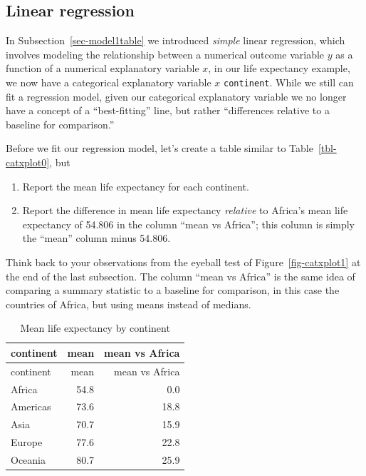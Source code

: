 \documentclass[
  letterpaper,
  DIV=11,
  numbers=noendperiod]{scrreprt}
\theoremstyle{definition}
\theoremstyle{remark}
\begin{document}
\hypertarget{sec-model2table}{%
\subsection{Linear regression}\label{sec-model2table}}

In Subsection~\ref{sec-model1table} we introduced \emph{simple} linear
regression, which involves modeling the relationship between a numerical
outcome variable \(y\) as a function of a numerical explanatory variable
\(x\), in our life expectancy example, we now have a categorical
explanatory variable \(x\) \texttt{continent}. While we still can fit a
regression model, given our categorical explanatory variable we no
longer have a concept of a ``best-fitting'' line, but rather
``differences relative to a baseline for comparison.''

Before we fit our regression model, let's create a table similar to
Table~\ref{tbl-catxplot0}, but

\begin{enumerate}
\def\labelenumi{\arabic{enumi}.}
\item
  Report the mean life expectancy for each continent.
\item
  Report the difference in mean life expectancy \emph{relative} to
  Africa's mean life expectancy of 54.806 in the column ``mean vs
  Africa''; this column is simply the ``mean'' column minus 54.806.
\end{enumerate}

Think back to your observations from the eyeball test of
Figure~\ref{fig-catxplot1} at the end of the last subsection. The column
``mean vs Africa'' is the same idea of comparing a summary statistic to
a baseline for comparison, in this case the countries of Africa, but
using means instead of medians.

\hypertarget{tbl-continent-mean-life-expectancies-}{}
\begin{longtable}[]{@{}lrr@{}}
\caption{\label{tbl-continent-mean-life-expectancies-}Mean life
expectancy by continent}\tabularnewline
\toprule()
continent & mean & mean vs Africa \\
\midrule()
\endfirsthead
\toprule()
continent & mean & mean vs Africa \\
\midrule()
\endhead
Africa & 54.8 & 0.0 \\
Americas & 73.6 & 18.8 \\
Asia & 70.7 & 15.9 \\
Europe & 77.6 & 22.8 \\
Oceania & 80.7 & 25.9 \\
\bottomrule()
\end{longtable}
\end{document}

